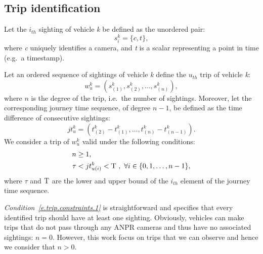 \subsection{Trip identification}\label{s.trips}

Let the $i_{th}$ sighting of vehicle \emph{k} be defined as the unordered pair:
\begin{equation} \label{e.sighting}
s^{k}_{i} = \{ c, t \},
\end{equation}
where \emph{c} uniquely identifies a camera, and \emph{t} is a scalar representing a point in time (e.g.\ a timestamp).

Let an ordered sequence of sightings of vehicle \emph{k} define the $u_{th}$ trip of vehicle \emph{k}:
\begin{equation} \label{e.trip}
w^{k}_{u} = \left(s^{k}_{(1)}, s^{k}_{(2)}, \dots , s^{k}_{(n)}\right),
\end{equation}
where \( n \) is the degree of the trip, i.e.\ the number of sightings. Moreover, let the corresponding journey time sequence, of degree \(n-1\), be defined as the time difference of consecutive sightings:
\begin{equation} \label{e.journeytime}
jt^{k}_{u} = \left(t^{k}_{(2)} - t^{k}_{(1)}, \ldots, t^{k}_{(n)} - t^{k}_{(n-1)} \right).
\end{equation}
We consider a trip of \emph{$w^k_u$} valid under the following conditions:
\begin{align}
n &\ge 1 , \label{e.trip.constraints.1} \\
\tau &< jt^{k}_{u(i)} < \mathrm{T} \ , \ \forall i \in \{0, 1 ,\ldots, n-1\} \label{e.trip.constraints.2},
\end{align}
where $\tau$ and $\mathrm{T}$ are the lower and upper bound of the $i_{th}$ element of the journey time sequence.

\textit{Condition~\ref{e.trip.constraints.1}} is straightforward and specifies that every identified trip should have at least one sighting. Obviously, vehicles can make trips that do not pass through any ANPR cameras and thus have no associated sightings: $n = 0$. However, this work focus on trips that we can observe and hence we consider that $n > 0$.

